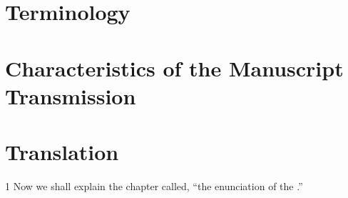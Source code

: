 	


\section{Terminology}



\section{Characteristics of the Manuscript Transmission}


\section{Translation}

\begin{translation}

\item [1] Now we shall explain the chapter called, “the enunciation of the
.”


\end{translation}
